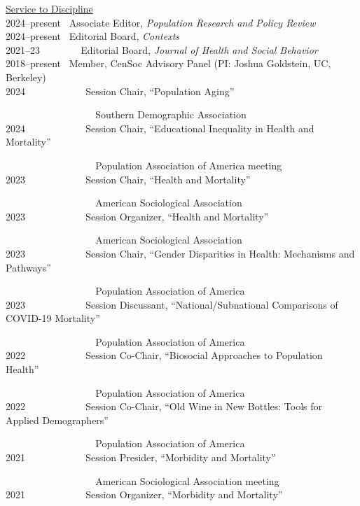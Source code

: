 \documentclass[11pt,]{article}
\begin{document}
\underline{Service to Discipline}\\
2024--present ~Associate Editor, \emph{Population Research and Policy
Review}\\
2024--present ~Editorial Board, \emph{Contexts}\\
2021--23 ~ ~ ~ ~ ~Editorial Board, \emph{Journal of Health and Social
Behavior}\\
2018--present ~Member, CenSoc Advisory Panel (PI: Joshua Goldstein, UC,
Berkeley)\\
2024 ~ ~ ~ ~ ~ ~ ~ Session Chair, ``Population Aging''\\
\strut ~ ~ ~ ~ ~ ~ ~ ~ ~ ~ ~ Southern Demographic Association\\
2024 ~ ~ ~ ~ ~ ~ ~ Session Chair, ``Educational Inequality in Health and
Mortality''\\
\strut ~ ~ ~ ~ ~ ~ ~ ~ ~ ~ ~ Population Association of America meeting\\
2023 ~ ~ ~ ~ ~ ~ ~ Session Chair, ``Health and Mortality''\\
\strut ~ ~ ~ ~ ~ ~ ~ ~ ~ ~ ~ American Sociological Association\\
2023 ~ ~ ~ ~ ~ ~ ~ Session Organizer, ``Health and Mortality''\\
\strut ~ ~ ~ ~ ~ ~ ~ ~ ~ ~ ~ American Sociological Association\\
2023 ~ ~ ~ ~ ~ ~ ~ Session Chair, ``Gender Disparities in Health:
Mechanisms and Pathways''\\
\strut ~ ~ ~ ~ ~ ~ ~ ~ ~ ~ ~ Population Association of America\\
2023 ~ ~ ~ ~ ~ ~ ~ Session Discussant, ``National/Subnational
Comparisons of COVID-19 Mortality''\\
\strut ~ ~ ~ ~ ~ ~ ~ ~ ~ ~ ~ Population Association of America\\
2022 ~ ~ ~ ~ ~ ~ ~ Session Co-Chair, ``Biosocial Approaches to
Population Health''\\
\strut ~ ~ ~ ~ ~ ~ ~ ~ ~ ~ ~ Population Association of America\\
2022 ~ ~ ~ ~ ~ ~ ~ Session Co-Chair, ``Old Wine in New Bottles: Tools
for Applied Demographers''\\
\strut ~ ~ ~ ~ ~ ~ ~ ~ ~ ~ ~ Population Association of America\\
2021 ~ ~ ~ ~ ~ ~ ~ Session Presider, ``Morbidity and Mortality''\\
\strut ~ ~ ~ ~ ~ ~ ~ ~ ~ ~ ~ American Sociological Association meeting\\
2021 ~ ~ ~ ~ ~ ~ ~ Session Organizer, ``Morbidity and Mortality''\\
\end{document}
